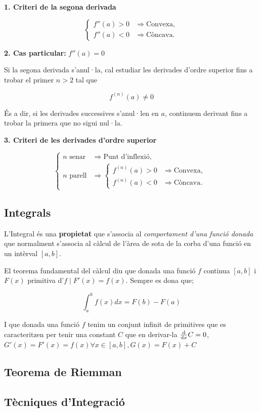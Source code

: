\documentclass[12pt]{article}
\begin{document}
\begin{itemize}
   \begin{tcolorbox}[
    colback=white,
    colframe=black,
    boxrule=0.6pt,
    arc=0mm
]

\textbf{1. Criteri de la segona derivada}

\[
\boxed{
\begin{cases}
f''(a)>0 & \Longrightarrow \text{Convexa},\\[2pt]
f''(a)<0 & \Longrightarrow \text{Còncava}.
\end{cases}}
\]

\medskip
\textbf{2. Cas particular: } $f''(a)=0$

Si la segona derivada s'anul·la, cal estudiar les derivades d'ordre superior fins a trobar el primer $n>2$ tal que

\[
\boxed{f^{(n)}(a)\neq 0}
\]

És a dir, si les derivades successives s'anul·len en $a$, continuem derivant fins a trobar la primera que no sigui nul·la.

\medskip
\textbf{3. Criteri de les derivades d'ordre superior}

\[
\boxed{
\begin{cases}
n \text{ senar}
&\Longrightarrow \text{Punt d'inflexió},\\[6pt]
n \text{ parell}
&\Longrightarrow
\begin{cases}
f^{(n)}(a)>0 & \Longrightarrow \text{Convexa},\\[2pt]
f^{(n)}(a)<0 & \Longrightarrow \text{Còncava}.
\end{cases}
\end{cases}}
\]

\end{tcolorbox}

\end{itemize}

\subsection{Integrals} 

L'Integral és una \textbf{propietat} que s'associa al \textit{comportament d'una funció donada} que normalment s'associa al càlcul de l'àrea de sota de la corba d'una funció en un intèrval $[a,b]$.

El teorema fundamental del càlcul diu que donada una funció $f$ continua $[a,b]$ i $F(x)$ primitiva d'$f \mid F'(x) = f(x)$. Sempre es dona que;

\[\int_{a}^{b} f(x) dx = F(b) - F(a)\]

I que donada una funció $f$ tenim un conjunt infinit de primitives que es caracteritzen per tenir una constant $C$ que en derivar-la $\dv{}{x} C = 0$, $G'(x) = F'(x) = f(x) \forall x \in [a,b], G(x) = F(x) + C$

\subsection{Teorema de Riemman}

\subsection{Tècniques d'Integració}
\end{document}
